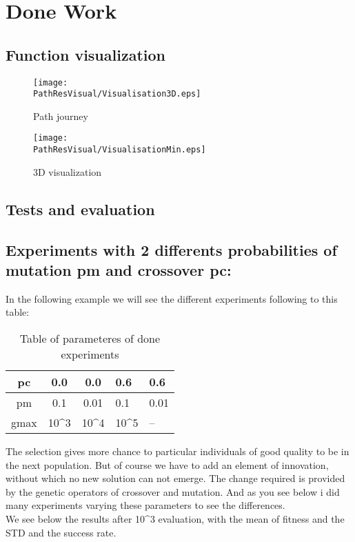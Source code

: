 \section{Done Work}
\subsection{Function visualization}
\begin{figure}[H]
		\centering
		\texttt{[image: \\PathResVisual/Visualisation3D.eps]}
		\caption{Path journey}\label{fig:Visualisation3D:PathResVisual}
\end{figure}
\begin{figure}[H]
		\centering
		\texttt{[image: \\PathResVisual/VisualisationMin.eps]}
		\caption{3D visualization}\label{fig:VisualisationMin:PathResVisual}
\end{figure}

\subsection{Tests and evaluation}
\subsection*{Experiments with 2 differents probabilities of mutation pm and crossover pc:}
In the following example we will see the different experiments following to this table:
\begin{table}[H]
\centering
\caption{Table of parameteres of done experiments}
\vspace{+6mm}
\label{tab:doneexp}
\begin{tabular}{|c|c|c|l|l|}
\hline
pc                         & 0.0                                       & 0.0                                       & 0.6                  & 0.6  \\ \hline
pm                         & 0.1                                       & 0.01                                      & 0.1                  & 0.01 \\ \hline
\multicolumn{1}{|l|}{gmax} & \multicolumn{1}{l|}{10\textasciicircum 3} & \multicolumn{1}{l|}{10\textasciicircum 4} & 10\textasciicircum 5 & --    \\ \hline
\end{tabular}
\end{table}
\pagebreak
The selection gives more chance to particular individuals of good quality to be in the next population. But of course we have to add an element of innovation, without which no new solution can not emerge. The change required is provided by the genetic operators of crossover and mutation.
And as you see below i did many experiments varying these parameters to see the differences.\\
We see below the results after 10\textasciicircum 3 evaluation, with the mean of fitness and the STD and the success rate.\\
